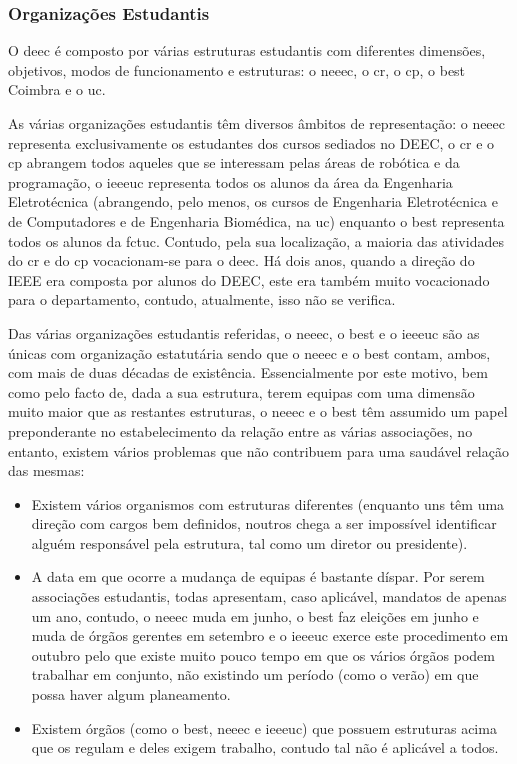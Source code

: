 
\subsubsection{Organizações Estudantis}

O \acrshort{deec} é composto por várias estruturas estudantis com diferentes dimensões, objetivos, modos de funcionamento e estruturas: o \acrfull{neeec}, o \acrfull{cr}, o \acrfull{cp}, o \acrfull{best} Coimbra e o \acrfull{uc}.

As várias organizações estudantis têm diversos âmbitos de representação: o \acrshort{neeec} representa exclusivamente os estudantes dos cursos sediados no DEEC, o \acrshort{cr} e o \acrshort{cp} abrangem todos aqueles que se interessam pelas áreas de robótica e da programação, o \acrshort{ieeeuc} representa todos os alunos da área da Engenharia Eletrotécnica (abrangendo, pelo menos, os cursos de Engenharia Eletrotécnica e de Computadores e de Engenharia Biomédica, na \acrlong{uc}) enquanto o \acrshort{best} representa todos os alunos da \acrshort{fctuc}. Contudo, pela sua localização, a maioria das atividades do \acrshort{cr} e do \acrshort{cp} vocacionam-se para o \acrshort{deec}. Há dois anos, quando a direção do IEEE era composta por alunos do DEEC, este era também muito vocacionado para o departamento, contudo, atualmente, isso não se verifica.

Das várias organizações estudantis referidas, o \acrshort{neeec}, o \acrshort{best} e o \acrshort{ieeeuc} são as únicas com organização estatutária sendo que o \acrshort{neeec} e o \acrshort{best} contam, ambos, com mais de duas décadas de existência. Essencialmente por este motivo, bem como pelo facto de, dada a sua estrutura, terem equipas com uma dimensão muito maior que as restantes estruturas, o \acrshort{neeec} e o \acrshort{best} têm assumido um papel preponderante no estabelecimento da relação entre as várias associações, no entanto, existem vários problemas que não contribuem para uma saudável relação das mesmas:
\begin{itemize}
\item Existem vários organismos com estruturas diferentes (enquanto uns têm uma direção com cargos bem definidos, noutros chega a ser impossível identificar alguém responsável pela estrutura, tal como um diretor ou presidente).
\item A data em que ocorre a mudança de equipas é bastante díspar. Por serem associações estudantis, todas apresentam, caso aplicável, mandatos de apenas um ano, contudo, o \acrshort{neeec} muda em junho, o \acrshort{best} faz eleições em junho e muda de órgãos gerentes em setembro e o \acrshort{ieeeuc} exerce este procedimento em outubro pelo que existe muito pouco tempo em que os vários órgãos podem trabalhar em conjunto, não existindo um período (como o verão) em que possa haver algum planeamento.
\item Existem órgãos (como o \acrshort{best}, \acrshort{neeec} e \acrshort{ieeeuc}) que possuem estruturas acima que os regulam e deles exigem trabalho, contudo tal não é aplicável a todos.
\end{itemize}

